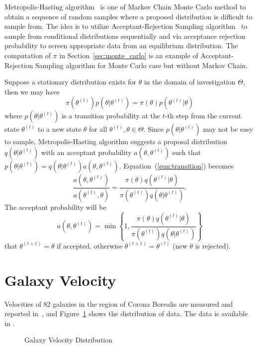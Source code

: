 Metropolis-Hasting algorithm~
is one of Markov Chain Monte Carlo method to obtain
a sequence of random samples where a proposed distribution is difficult to
sample from. The idea is to utilize Acceptant-Rejection Sampling
algorithm~
to sample from conditional distributions sequentially
and via acceptance rejection probability to screen appropriate data
from an equilibrium distribution.
The computation of $\pi$ in Section~\ref{sec:monte_carlo}
is an example of Acceptant-Rejection Sampling algorithm for
Monte Carlo case but without Markov Chain.

Suppose a stationary distribution exists for $\theta$ in the domain of
investigation $\Theta$, then we may have
\begin{equation}
\pi(\theta^{(t)}) p(\theta | \theta^{(t)}) = \pi(\theta) p(\theta^{(t)} | \theta)
\label{eqn:transition}
\end{equation}
where $p(\theta | \theta^{(t)})$ is a transition probability at the $t$-th step
from the current state $\theta^{(t)}$ to a new state $\theta$ for all
$\theta^{(t)}, \theta \in \Theta$.
Since $p(\theta | \theta^{(t)})$ may not be easy to sample, Metropolis-Hasting
algorithm suggests a proposal distribution $q(\theta | \theta^{(t)})$ with an
acceptant probability $a(\theta , \theta^{(t)})$ such that
$p(\theta | \theta^{(t)}) = q(\theta | \theta^{(t)}) a(\theta, \theta^{(t)})$.
Equation~(\ref{eqn:transition}) becomes
\begin{equation*}
\frac{a(\theta , \theta^{(t)})}{a(\theta^{(t)} , \theta)}
=
\frac{\pi(\theta) q(\theta^{(t)} | \theta)}{\pi(\theta^{(t)}) q(\theta | \theta^{(t)})}.
\end{equation*}
The acceptant probability will be
\begin{equation}
a(\theta , \theta^{(t)}) = \min \left\{
1,
\frac{\pi(\theta) q(\theta^{(t)} | \theta)}{
      \pi(\theta^{(t)}) q(\theta | \theta^{(t)})}
\right\}
\label{eqn:acceptant_probability}
\end{equation}
that
$\theta^{(t+1)} = \theta$ if accepted, otherwise
$\theta^{(t+1)} = \theta^{(t)}$ (new $\theta$ is rejected).


\section[Galaxy Velocity]{Galaxy Velocity}
\label{sec:galaxy}

Velocities of 82 galaxies in the region of Corona Borealis are
measured and reported in~\citep{Roeder1990}, and Figure~\ref{fig:galaxy}
shows the distribution of data. The data is available in .
\begin{figure}[ht]
\centering
\caption{Galaxy Velocity Distribution}
\label{fig:galaxy}
\end{figure}





